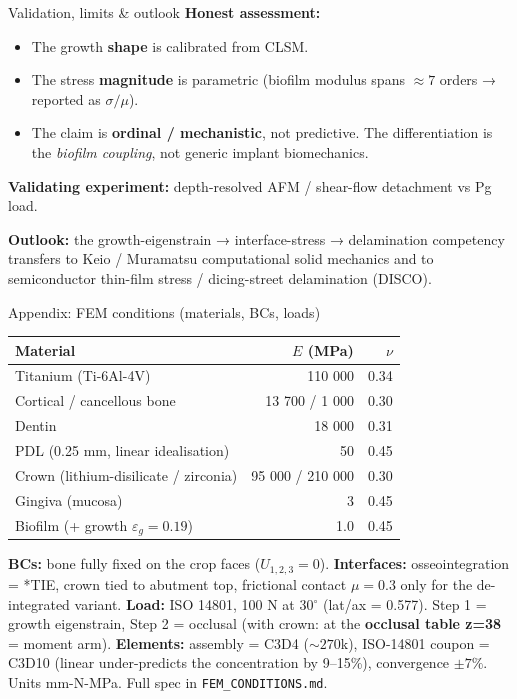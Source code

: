 \documentclass[
  ignorenonframetext,
  aspectratio=169,
]{beamer}
\providecommand{\tightlist}{%
  \setlength{\itemsep}{0pt}\setlength{\parskip}{0pt}}
\begin{document}
\begin{frame}{Validation, limits \& outlook}
\protect\hypertarget{validation-limits-outlook}{}
\textbf{Honest assessment:}

\begin{itemize}
\tightlist
\item
  The growth \textbf{shape} is calibrated from CLSM.
\item
  The stress \textbf{magnitude} is parametric (biofilm modulus spans
  \(\approx 7\) orders → reported as \(\sigma/\mu\)).
\item
  The claim is \textbf{ordinal / mechanistic}, not predictive. The
  differentiation is the \emph{biofilm coupling}, not generic implant
  biomechanics.
\end{itemize}

\textbf{Validating experiment:} depth-resolved AFM / shear-flow
detachment vs Pg load.

\vspace{0.3em}

\textbf{Outlook:} the growth-eigenstrain → interface-stress →
delamination competency transfers to Keio / Muramatsu computational
solid mechanics and to semiconductor thin-film stress / dicing-street
delamination (DISCO).
\end{frame}

\begin{frame}[fragile]{Appendix: FEM conditions (materials, BCs, loads)}
\protect\hypertarget{appendix-fem-conditions-materials-bcs-loads}{}
\begin{longtable}[]{@{}lrr@{}}
\toprule
Material & \(E\) (MPa) & \(\nu\) \\
\midrule
\endhead
Titanium (Ti-6Al-4V) & 110 000 & 0.34 \\
Cortical / cancellous bone & 13 700 / 1 000 & 0.30 \\
Dentin & 18 000 & 0.31 \\
PDL (0.25 mm, linear idealisation) & 50 & 0.45 \\
Crown (lithium-disilicate / zirconia) & 95 000 / 210 000 & 0.30 \\
Gingiva (mucosa) & 3 & 0.45 \\
Biofilm (+ growth \(\varepsilon_g=0.19\)) & 1.0 & 0.45 \\
\bottomrule
\end{longtable}

\footnotesize

\textbf{BCs:} bone fully fixed on the crop faces (\(U_{1,2,3}=0\)).
\textbf{Interfaces:} osseointegration = *TIE, crown tied to abutment
top, frictional contact \(\mu=0.3\) only for the de-integrated variant.
\textbf{Load:} ISO 14801, 100 N at 30\(^\circ\) (lat/ax = 0.577). Step 1
= growth eigenstrain, Step 2 = occlusal (with crown: at the
\textbf{occlusal table z=38} = moment arm). \textbf{Elements:} assembly
= C3D4 (\({\sim}270\)k), ISO-14801 coupon = C3D10 (linear under-predicts
the concentration by 9--15\%), convergence \(\pm7\%\). Units mm-N-MPa.
Full spec in \texttt{FEM\_CONDITIONS.md}. \normalsize
\end{frame}
\end{document}
